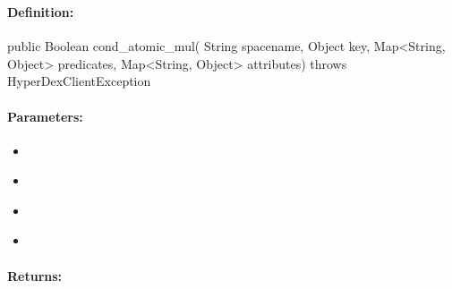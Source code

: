 \subsubsection{}
\label{api:java:cond_atomic_mul}


\paragraph{Definition:}
\begin{javacode}
public Boolean cond_atomic_mul(
        String spacename,
        Object key,
        Map<String, Object> predicates,
        Map<String, Object> attributes) throws HyperDexClientException
\end{javacode}

\paragraph{Parameters:}
\begin{itemize}[noitemsep]
\item {}\\

\item {}\\

\item {}\\

\item {}\\

\end{itemize}

\paragraph{Returns:}


\pagebreak
\subsubsection{}
\label{api:java:async_cond_atomic_mul}



